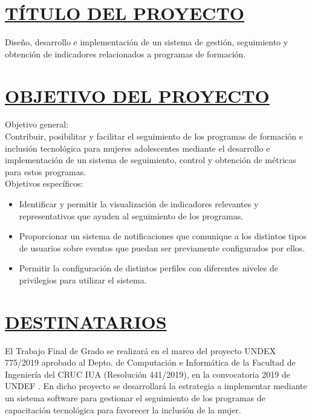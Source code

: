 \section*{\underline{TÍTULO DEL PROYECTO}}
Diseño, desarrollo e implementación de un sistema de gestión, seguimiento y obtención de indicadores relacionados a programas de formación.\\


\section*{\underline{OBJETIVO DEL PROYECTO}}
Objetivo general:\\

Contribuir, posibilitar y facilitar el seguimiento de los programas de formación e inclusión tecnológica para mujeres adolescentes mediante el desarrollo e implementación de un sistema de seguimiento, control y obtención de métricas para estos programas.\\

Objetivos específicos:
\begin{itemize}
	\item Identificar y permitir la visualización de indicadores relevantes y representativos que ayuden al seguimiento de los programas.
	\item Proporcionar un sistema de notificaciones que comunique a los distintos tipos de usuarios sobre eventos que puedan ser previamente configurados por ellos.
	\item Permitir la configuración de distintos perfiles con diferentes niveles de  privilegios para utilizar el sistema.\\
\end{itemize}


\section*{\underline{DESTINATARIOS}}
El Trabajo Final de Grado se realizará en el marco del proyecto UNDEX 775/2019 aprobado al Depto. de Computación e Informática de la Facultad de Ingeniería del CRUC IUA (Resolución 441/2019), en la convocatoria 2019 de UNDEF \textbf{\cite{ResolucionUndex}}. En dicho proyecto se desarrollará la estrategia a implementar mediante un sistema software para gestionar el seguimiento de los programas de capacitación tecnológica para favorecer la inclusión de la mujer. \\


